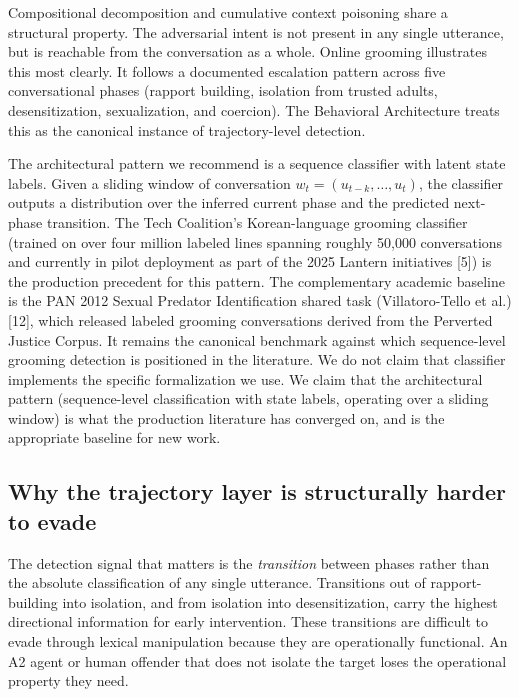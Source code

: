 \documentclass[11pt]{article}
\begin{document}
Compositional decomposition and cumulative context poisoning share a structural property. The adversarial intent is not present in any single utterance, but is reachable from the conversation as a whole. Online grooming illustrates this most clearly. It follows a documented escalation pattern across five conversational phases (rapport building, isolation from trusted adults, desensitization, sexualization, and coercion). The Behavioral Architecture treats this as the canonical instance of trajectory-level detection.

The architectural pattern we recommend is a sequence classifier with latent state labels. Given a sliding window of conversation $w_t = (u_{t-k}, \ldots, u_t)$, the classifier outputs a distribution over the inferred current phase and the predicted next-phase transition. The Tech Coalition's Korean-language grooming classifier (trained on over four million labeled lines spanning roughly 50{,}000 conversations and currently in pilot deployment as part of the 2025 Lantern initiatives [5]) is the production precedent for this pattern. The complementary academic baseline is the PAN 2012 Sexual Predator Identification shared task (Villatoro-Tello et al.) [12], which released labeled grooming conversations derived from the Perverted Justice Corpus. It remains the canonical benchmark against which sequence-level grooming detection is positioned in the literature. We do not claim that classifier implements the specific formalization we use. We claim that the architectural pattern (sequence-level classification with state labels, operating over a sliding window) is what the production literature has converged on, and is the appropriate baseline for new work.

\subsection{Why the trajectory layer is structurally harder to evade}

The detection signal that matters is the \emph{transition} between phases rather than the absolute classification of any single utterance. Transitions out of rapport-building into isolation, and from isolation into desensitization, carry the highest directional information for early intervention. These transitions are difficult to evade through lexical manipulation because they are operationally functional. An A2 agent or human offender that does not isolate the target loses the operational property they need.
\end{document}

